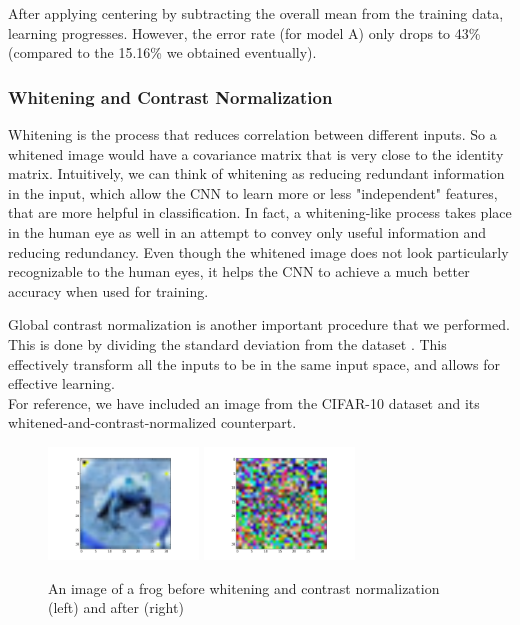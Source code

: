     After applying centering by subtracting the overall mean from the training data, learning progresses. However, the error rate (for model A) only drops to 43\% (compared to the 15.16\% we obtained eventually).
    
\subsubsection{Whitening and Contrast Normalization}
    Whitening is the process that reduces correlation between different inputs. So a whitened image would have a covariance matrix that is very close to the identity matrix. Intuitively, we can think of whitening as reducing redundant information in the input, which allow the CNN to learn more or less "independent" features, that are more helpful in classification. In fact, a whitening-like process takes place in the human eye as well in an attempt to convey only useful information and reducing redundancy. Even though the whitened image does not look particularly recognizable to the human eyes, it helps the CNN to achieve a much better accuracy when used for training.
    
    Global contrast normalization is another important procedure that we performed. This is done by dividing the standard deviation from the dataset \cite{coates2011analysis}. This effectively transform all the inputs to be in the same input space, and allows for effective learning.\\
    For reference, we have included an image from the CIFAR-10 dataset and its whitened-and-contrast-normalized counterpart.
    \begin{figure}[hb]
    	\includegraphics[width = 4cm]{img/frog.png}
    	\includegraphics[width=4cm]{img/frog_whitened.png}
    	\caption{An image of a frog before whitening and contrast normalization (left) and after (right)}
    	\label{fig:frog}
    \end{figure}\\

